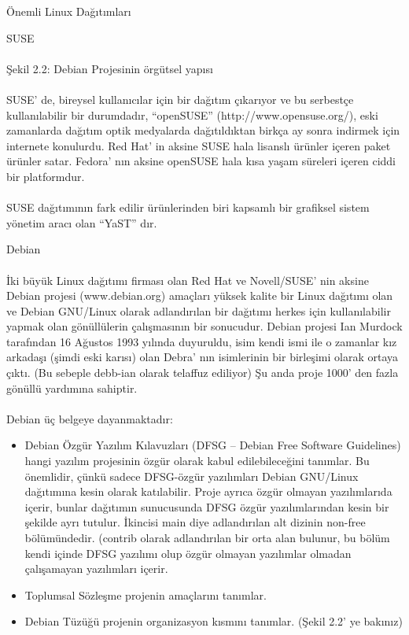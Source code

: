 \documentclass[10pt,a5paper]{book}
\begin{document}
\begin{section}{Önemli Linux Dağıtımları}
\begin{subsection}{SUSE}
\paragraph{}{ Şekil 2.2: Debian Projesinin örgütsel yapısı}
\paragraph{}{SUSE' de, bireysel kullanıcılar için bir dağıtım çıkarıyor ve bu serbestçe kullanılabilir bir durumdadır, “openSUSE” (http://www.opensuse.org/), eski zamanlarda dağıtım optik medyalarda dağıtıldıktan birkça ay sonra indirmek için internete konulurdu. Red Hat' in aksine SUSE hala lisanslı ürünler içeren paket ürünler satar. Fedora' nın aksine openSUSE hala kısa yaşam süreleri içeren ciddi bir platformdur.}
\paragraph{}{SUSE dağıtımının fark edilir ürünlerinden biri kapsamlı bir grafiksel sistem yönetim aracı olan “YaST” dır.}
\end{subsection}
\begin{subsection}{Debian}
\paragraph{}{İki büyük Linux dağıtımı firması olan Red Hat ve Novell/SUSE' nin aksine Debian projesi (www.debian.org) amaçları yüksek kalite bir Linux dağıtımı olan ve Debian GNU/Linux olarak adlandırılan bir dağıtımı herkes için kullanılabilir yapmak olan gönüllülerin çalışmasının bir sonucudur. Debian projesi Ian Murdock tarafından 16 Ağustos 1993 yılında duyuruldu, isim kendi ismi ile o zamanlar kız arkadaşı (şimdi eski karısı) olan Debra' nın isimlerinin bir birleşimi olarak ortaya çıktı. (Bu sebeple debb-ian olarak telaffuz ediliyor) Şu anda proje 1000' den fazla gönüllü yardımına sahiptir.}
\paragraph{}{Debian üç belgeye dayanmaktadır:}
\begin{itemize}
 \item Debian Özgür Yazılım Kılavuzları (DFSG – Debian Free Software Guidelines) hangi yazılım projesinin özgür olarak kabul edilebileceğini tanımlar. Bu önemlidir, çünkü sadece DFSG-özgür yazılımları Debian GNU/Linux dağıtımına kesin olarak katılabilir. Proje ayrıca özgür olmayan yazılımlarıda içerir, bunlar dağıtımın sunucusunda DFSG özgür yazılımlarından kesin bir şekilde ayrı tutulur. İkincisi main diye adlandırılan alt dizinin non-free bölümündedir. (contrib olarak adlandırılan bir orta alan bulunur, bu bölüm kendi içinde DFSG yazılımı olup özgür olmayan yazılımlar olmadan çalışamayan yazılımları içerir.
 \item Toplumsal Sözleşme projenin amaçlarını tanımlar.
 \item Debian Tüzüğü projenin organizasyon kısmını tanımlar. (Şekil 2.2' ye bakınız)
\end{itemize}

\end{subsection}
\end{section}
\end{document}
